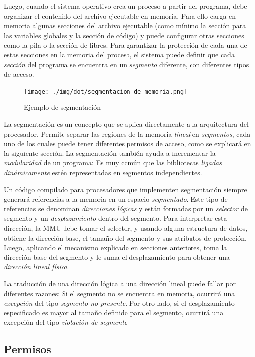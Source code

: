 \documentclass[11pt,fleqn]{book} %
\begin{document}
Luego, cuando el sistema operativo crea un proceso a partir del programa,
debe organizar el contenido del archivo ejecutable en memoria. Para ello
carga en memoria algunas secciones del archivo ejecutable (como mínimo
la sección para las variables globales y la sección de código) y puede
configurar otras secciones como la pila o la sección de libres. 
Para garantizar la protección de cada una de estas secciones en la
memoria del proceso, el sistema puede definir que cada \emph{sección} del 
programa se encuentra en un \emph{segmento} diferente, con diferentes 
tipos de acceso.


\begin{figure}[htb]
\centering
\texttt{[image: ./img/dot/segmentacion\_de\_memoria.png]}
\caption{\label{MEM_segmentacion_de_memoria}Ejemplo de segmentación}
\end{figure}

La segmentación es un concepto que se aplica directamente a la
arquitectura del procesador. Permite separar las regiones de la
memoria \emph{lineal} en \emph{segmentos}, cada uno de los cuales puede tener
diferentes permisos de acceso, como se explicará en la siguiente
sección. La segmentación también ayuda a incrementar la \emph{modularidad}
de un programa: Es muy común que las bibliotecas \emph{ligadas dinámicamente} estén representadas en segmentos independientes.

Un código compilado para procesadores que implementen segmentación
siempre generará referencias a la memoria en un espacio \emph{segmentado}. Este 
tipo de referencias se denominan \emph{direcciones lógicas} y están formadas por un
\emph{selector} de segmento y un \emph{desplazamiento} dentro del segmento. 
Para interpretar esta dirección, la MMU debe tomar el selector, y usando 
alguna estructura de datos, 
obtiene la dirección base, el tamaño del segmento y sus atributos
de protección. Luego, aplicando el mecanismo explicado en secciones
anteriores, toma la dirección base del segmento y le suma el desplazamiento
para obtener una \emph{dirección lineal física}. 

La traducción de una dirección lógica a una dirección lineal puede fallar
por diferentes razones: Si el segmento no se encuentra en memoria, ocurrirá
una \emph{excepción} del tipo \emph{segmento no presente}. Por otro lado, si el 
desplazamiento especificado es mayor al tamaño definido para el segmento, 
ocurrirá una excepción del tipo \emph{violación de segmento} 
\subsection{Permisos}
\label{sec-5-3-1}
\end{document}
